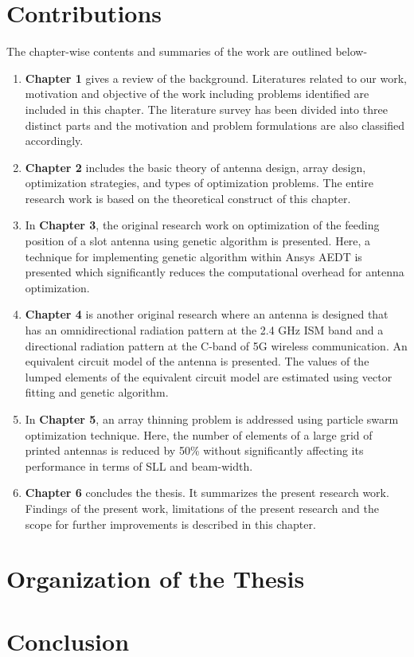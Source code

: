 \section{Contributions}
The chapter-wise contents and summaries of the work are outlined below-
\begin{enumerate}
\item \textbf{Chapter 1} gives a review of the background. Literatures related to our work, motivation and objective of the work including problems identified are included in this chapter. The literature survey has been divided into three distinct parts and the motivation and problem formulations are also classified accordingly.
\item \textbf{Chapter 2} includes the basic theory of antenna design, array design, optimization strategies, and types of optimization problems. The entire research work is based on the theoretical construct of this chapter.
\item In \textbf{Chapter 3}, the original research work on optimization of the feeding position of a slot antenna using genetic algorithm is presented. Here, a technique for implementing genetic algorithm within Ansys AEDT is presented which significantly reduces the computational overhead for antenna optimization.
\item \textbf{Chapter 4} is another original research where an antenna is designed that has an omnidirectional radiation pattern at the 2.4 GHz ISM band and a directional radiation pattern at the C-band of 5G wireless communication. An equivalent circuit model of the antenna is presented. The values of the lumped elements of the equivalent circuit model are estimated using vector fitting and genetic algorithm.
\item In \textbf{Chapter 5}, an array thinning problem is addressed using particle swarm optimization technique. Here, the number of elements of a large grid of printed antennas is reduced by 50\% without significantly affecting its performance in terms of SLL and beam-width.
\item \textbf{Chapter 6} concludes the thesis. It summarizes the present research work. Findings of the present work, limitations of the present research and the scope for further improvements is described in this chapter.
\end{enumerate}
\section{Organization of the Thesis}

\section{Conclusion} 